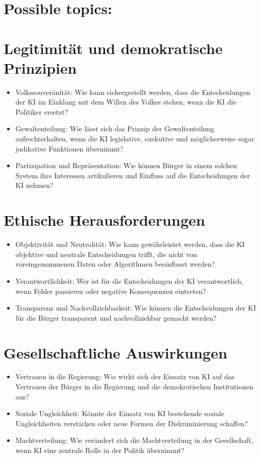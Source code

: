 \documentclass{article}
\begin{document}
\section*{Possible topics:}


\section*{Legitimität und demokratische Prinzipien}
\begin{itemize}
    \item Volkssouveränität: Wie kann sichergestellt werden, dass die Entscheidungen der KI im Einklang mit dem Willen des Volkes stehen, wenn die KI die Politiker ersetzt?
    \item Gewaltenteilung: Wie lässt sich das Prinzip der Gewaltenteilung aufrechterhalten, wenn die KI legislative, exekutive und möglicherweise sogar judikative Funktionen übernimmt?
    \item Partizipation und Repräsentation: Wie können Bürger in einem solchen System ihre Interessen artikulieren und Einfluss auf die Entscheidungen der KI nehmen?
\end{itemize}

\section*{Ethische Herausforderungen}
\begin{itemize}
    \item Objektivität und Neutralität: Wie kann gewährleistet werden, dass die KI objektive und neutrale Entscheidungen trifft, die nicht von voreingenommenen Daten oder Algorithmen beeinflusst werden?
    \item Verantwortlichkeit: Wer ist für die Entscheidungen der KI verantwortlich, wenn Fehler passieren oder negative Konsequenzen eintreten?
    \item Transparenz und Nachvollziehbarkeit: Wie können die Entscheidungen der KI für die Bürger transparent und nachvollziehbar gemacht werden?
\end{itemize}

\section*{Gesellschaftliche Auswirkungen}
\begin{itemize}
    \item Vertrauen in die Regierung: Wie wirkt sich der Einsatz von KI auf das Vertrauen der Bürger in die Regierung und die demokratischen Institutionen aus?
    \item Soziale Ungleichheit: Könnte der Einsatz von KI bestehende soziale Ungleichheiten verstärken oder neue Formen der Diskriminierung schaffen?
    \item Machtverteilung: Wie verändert sich die Machtverteilung in der Gesellschaft, wenn KI eine zentrale Rolle in der Politik übernimmt?
\end{itemize}
\end{document}
